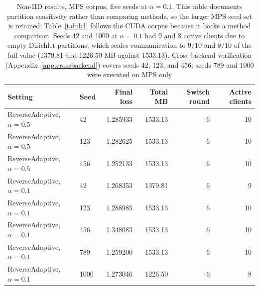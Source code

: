\documentclass[iicol,pdflatex,sn-mathphys-num]{sn-jnl}
\begin{document}
\begin{appendices}
\begin{table}[tbp]
\centering
\footnotesize
\setlength{\tabcolsep}{6pt}
\caption{Non-IID results, MPS corpus, five seeds at $\alpha{=}0.1$. This table documents partition sensitivity rather than comparing methods, so the larger MPS seed set is retained; Table~\ref{tab:b1} follows the CUDA corpus because it backs a method comparison. Seeds 42 and 1000 at $\alpha{=}0.1$ had 9 and 8 active clients due to empty Dirichlet partitions, which scales communication to $9/10$ and $8/10$ of the full value (1379.81 and 1226.50 MB against 1533.13). Cross-backend verification (Appendix~\ref{app:crossbackend}) covers seeds 42, 123, and 456; seeds 789 and 1000 were executed on MPS only}
\label{tab:b2}
\begin{tabular}{@{}llrrrr@{}}
\toprule
Setting & Seed & Final loss & Total MB & Switch round & Active clients \\
\midrule
ReverseAdaptive, $\alpha{=}0.5$ & 42 & 1.285933 & 1533.13 & 6 & 10 \\
ReverseAdaptive, $\alpha{=}0.5$ & 123 & 1.282625 & 1533.13 & 6 & 10 \\
ReverseAdaptive, $\alpha{=}0.5$ & 456 & 1.252133 & 1533.13 & 6 & 10 \\
ReverseAdaptive, $\alpha{=}0.1$ & 42 & 1.268353 & 1379.81 & 6 & 9 \\
ReverseAdaptive, $\alpha{=}0.1$ & 123 & 1.288985 & 1533.13 & 6 & 10 \\
ReverseAdaptive, $\alpha{=}0.1$ & 456 & 1.348083 & 1533.13 & 6 & 10 \\
ReverseAdaptive, $\alpha{=}0.1$ & 789 & 1.259200 & 1533.13 & 6 & 10 \\
ReverseAdaptive, $\alpha{=}0.1$ & 1000 & 1.273046 & 1226.50 & 6 & 8 \\
\bottomrule
\end{tabular}
\end{table}


\end{appendices}
\end{document}
